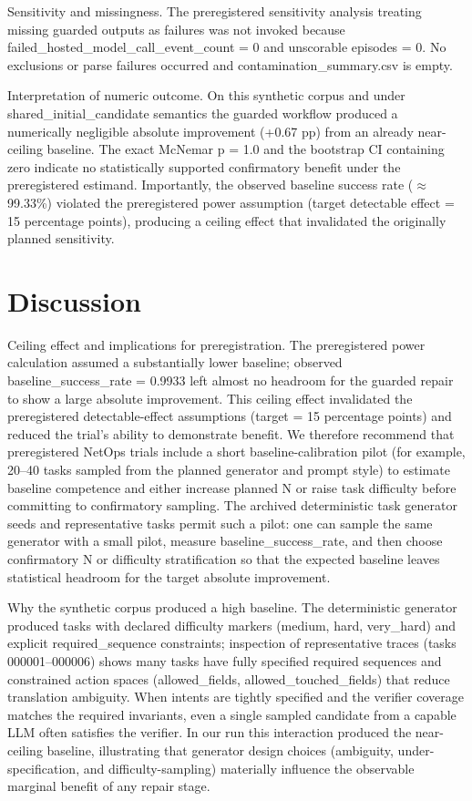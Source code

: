 \documentclass[conference]{IEEEtran}
\begin{document}
Sensitivity and missingness. The preregistered sensitivity analysis treating missing guarded outputs as failures was not invoked because failed\_hosted\_model\_call\_event\_count = 0 and unscorable episodes = 0. No exclusions or parse failures occurred and contamination\_summary.csv is empty.

Interpretation of numeric outcome. On this synthetic corpus and under shared\_initial\_candidate semantics the guarded workflow produced a numerically negligible absolute improvement (+0.67 pp) from an already near-ceiling baseline. The exact McNemar p = 1.0 and the bootstrap CI containing zero indicate no statistically supported confirmatory benefit under the preregistered estimand. Importantly, the observed baseline success rate (\ensuremath{\approx}99.33\%) violated the preregistered power assumption (target detectable effect = 15 percentage points), producing a ceiling effect that invalidated the originally planned sensitivity.

\section{Discussion}
Ceiling effect and implications for preregistration. The preregistered power calculation assumed a substantially lower baseline; observed baseline\_success\_rate = 0.9933 left almost no headroom for the guarded repair to show a large absolute improvement. This ceiling effect invalidated the preregistered detectable-effect assumptions (target = 15 percentage points) and reduced the trial's ability to demonstrate benefit. We therefore recommend that preregistered NetOps trials include a short baseline-calibration pilot (for example, 20--40 tasks sampled from the planned generator and prompt style) to estimate baseline competence and either increase planned N or raise task difficulty before committing to confirmatory sampling. The archived deterministic task generator seeds and representative tasks permit such a pilot: one can sample the same generator with a small pilot, measure baseline\_success\_rate, and then choose confirmatory N or difficulty stratification so that the expected baseline leaves statistical headroom for the target absolute improvement.

Why the synthetic corpus produced a high baseline. The deterministic generator produced tasks with declared difficulty markers (medium, hard, very\_hard) and explicit required\_sequence constraints; inspection of representative traces (tasks 000001--000006) shows many tasks have fully specified required sequences and constrained action spaces (allowed\_fields, allowed\_touched\_fields) that reduce translation ambiguity. When intents are tightly specified and the verifier coverage matches the required invariants, even a single sampled candidate from a capable LLM often satisfies the verifier. In our run this interaction produced the near-ceiling baseline, illustrating that generator design choices (ambiguity, under-specification, and difficulty-sampling) materially influence the observable marginal benefit of any repair stage.
\end{document}
